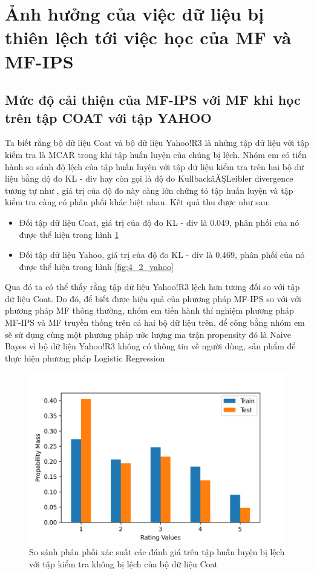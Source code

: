 \section{Ảnh hưởng của việc dữ liệu bị thiên lệch tới việc học của MF và MF-IPS}
\subsection{Mức độ cải thiện của MF-IPS với MF khi học trên tập COAT với tập YAHOO}

Ta biết rằng bộ dữ liệu Coat và bộ dữ liệu Yahoo!R3 là những tập dữ liệu với tập kiểm tra là MCAR trong khi tập huấn luyện của chúng bị lệch. Nhóm em có tiến hành so sánh độ lệch của tập huấn luyện với tập dữ liệu kiểm tra trên hai bộ dữ liệu bằng độ đo KL - div hay còn gọi là độ đo KullbackâĂŞLeibler divergence tương tự như \cite{saito2020asymmetric}, giá trị của độ đo này càng lớn chứng tỏ tập huấn luyện và tập kiểm tra càng có phân phối khác biệt nhau. Kết quả thu được như sau:
\begin{itemize}
    \item Đối tập dữ liệu Coat, giá trị của độ đo KL - div là 0.049, phân phối của nó được thể hiện trong hình \ref{fig:4_1_coat}
    \item Đối tập dữ liệu Yahoo, giá trị của độ đo KL - div là 0.469, phân phối của nó được thể hiện trong hình \ref{fig:4_2_yahoo}
\end{itemize}
Qua đó ta có thể thấy rằng tập dữ liệu Yahoo!R3 lệch hơn tương đối so với tập dữ liệu Coat. Do đó, để biết được hiệu quả của phương pháp MF-IPS so với với phương pháp MF thông thường, nhóm em tiến hành thí nghiệm phương pháp MF-IPS và MF truyền thống trên cả hai bộ dữ liệu trên, để công bằng nhóm em sẽ sử dụng cùng một phương pháp ước lượng ma trận propensity đó là Naive Bayes vì bộ dữ liệu Yahoo!R3 không có thông tin về người dùng, sản phẩm để thực hiện phương pháp Logistic Regression  

\begin{figure}[h]
    \centering
    \includegraphics[width=\textwidth]{images/Chapter4/Diff_coat.png}
    \caption{So sánh phân phối xác suất các đánh giá trên tập huấn luyện bị lệch với tập kiểm tra không bị lệch của bộ dữ liệu Coat}
    \label{fig:4_1_coat}
\end{figure}

